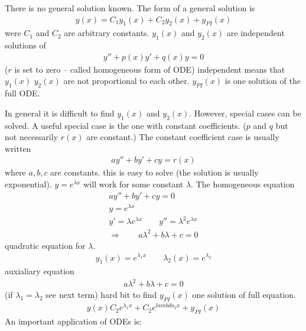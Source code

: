 There is no general solution known. The form of a general solution is
\begin{align*}
y(x) = C_1 y_1(x) + C_2y_2(x) + y_{PI} (x)
\end{align*}
were $C_1$ and $C_2$ are arbitrary constants. $y_1(x)$ and $y_2(x)$ are independent solutions of 
\begin{align*}
y'' + p(x) y' + q(x) y = 0
\end{align*}
($r$ is set to zero -- called homogeneous form of ODE)
independent means that $y_1(x)$ $y_2(x)$ are not proportional to each other.
$y_{PI}(x)$ is one solution of the full ODE. 

In general it is difficult to find $y_1(x)$ and $y_2(x)$. However, special cases can be solved. A useful special case is the one with constant coefficients. ($p$ and $q$ but not necessarily $r(x)$ are constant.)
The constant coefficient case is usually written
\begin{align*}
ay'' + by' + cy = r(x)
\end{align*}
where $a,b,c$ are constants. this is easy to solve (the solution is usually exponential). $y= e^{\lambda x}$ will work for some constant $\lambda$. The homogeneous equation
\begin{align*}
ay'' + by' + cy =0 \\
y = e^{\lambda x} \\
y' = \lambda e^{\lambda x} \qquad y''= \lambda^2 e^{\lambda x} \\
\Rightarrow \qquad a \lambda^2 + b \lambda + c = 0 
\end{align*}
quadratic equation for $\lambda$.
\begin{align*}
y_1(x) = e^{\lambda_1 x} \qquad \lambda_2(x) = e^{\lambda_2}
\end{align*}
auxialiary equation
\begin{align*}
a\lambda^2+b \lambda + c = 0
\end{align*}
(if $\lambda_1 = \lambda_2$ see next term)
hard bit to find $y_{PI}(x)$ one solution of full equation.
\begin{align*}
y(x) C_2 e^{\lambda_1 x} + C_2 e^{lambda_2 x} + y_{PI} (x)
\end{align*}
An important application of ODEs is:

